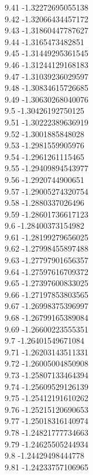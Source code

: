 {9.41	-1.32272695055138\\
9.42	-1.32066434457172\\
9.43	-1.31860447787627\\
9.44	-1.3165473482851\\
9.45	-1.31449295361545\\
9.46	-1.31244129168183\\
9.47	-1.31039236029597\\
9.48	-1.30834615726685\\
9.49	-1.30630268040076\\
9.5	-1.30426192750125\\
9.51	-1.30222389636919\\
9.52	-1.3001885848028\\
9.53	-1.2981559905976\\
9.54	-1.2961261115465\\
9.55	-1.29409894543977\\
9.56	-1.2920744900651\\
9.57	-1.29005274320754\\
9.58	-1.2880337026496\\
9.59	-1.28601736617123\\
9.6	-1.28400373154982\\
9.61	-1.28199279656025\\
9.62	-1.27998455897488\\
9.63	-1.27797901656357\\
9.64	-1.27597616709372\\
9.65	-1.27397600833025\\
9.66	-1.27197853803565\\
9.67	-1.26998375396997\\
9.68	-1.26799165389084\\
9.69	-1.26600223555351\\
9.7	-1.26401549671084\\
9.71	-1.26203143511331\\
9.72	-1.26005004850908\\
9.73	-1.25807133464394\\
9.74	-1.25609529126139\\
9.75	-1.25412191610262\\
9.76	-1.25215120690653\\
9.77	-1.25018316140974\\
9.78	-1.24821777734663\\
9.79	-1.24625505244934\\
9.8	-1.24429498444778\\
9.81	-1.24233757106965\\
}
